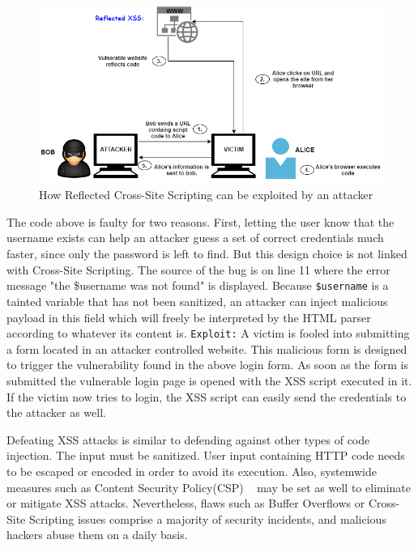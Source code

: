 \begin{figure}[ht]
 \centering
 \captionsetup{justification=centering}
 \includegraphics[width=5.0in]{figures/reflectedxss.png}
 \caption{How Reflected Cross-Site Scripting can be exploited by an attacker}
 \label{fig:reflectedxss}
\end{figure}


The code above is faulty for two reasons. First, letting the user know that the username exists can help an attacker guess a set of correct credentials much faster, since only the password is left to find. But this design choice is not linked with Cross-Site Scripting. The source of the bug is on line 11 where the error message "the \$username was not found" is displayed. Because {\tt \$username} is a tainted variable that has not been sanitized, an attacker can inject malicious payload in this field which will freely be interpreted by the HTML parser according to whatever its content is. 
{\tt Exploit:} A victim is fooled into submitting a form located in an attacker controlled website. This malicious form is
designed to trigger the vulnerability found in the above login form. As soon as the form is submitted the vulnerable login
page is opened with the XSS script executed in it. If the victim now tries to login, the XSS script can easily send the
credentials to the attacker as well. 

Defeating XSS attacks is similar to defending against other types of code injection.
The input must be sanitized. User input containing HTTP code needs to be escaped or encoded in order to avoid its execution. Also, systemwide measures
such as Content Security Policy(CSP) ~\cite{csp_def} may be set as well to eliminate or mitigate XSS attacks. Nevertheless, flaws such as Buffer Overflows or Cross-Site Scripting issues comprise a majority of security incidents, and malicious hackers abuse them on a daily basis. 

